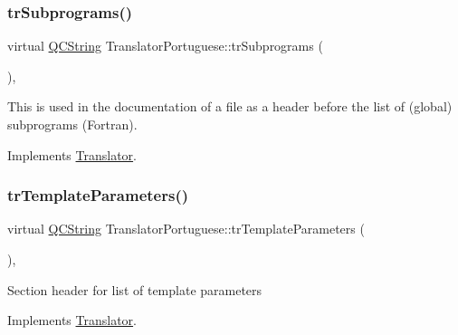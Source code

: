 \mbox{\label{class_translator_portuguese_ae3921a56819b66c9fe81c959828c3238}} 
\subsubsection{\texorpdfstring{trSubprograms()}{trSubprograms()}}
{\footnotesize\ttfamily virtual \mbox{\hyperlink{class_q_c_string}{Q\+C\+String}} Translator\+Portuguese\+::tr\+Subprograms (\begin{DoxyParamCaption}{ }\end{DoxyParamCaption})\hspace{0.3cm}{\ttfamily [inline]}, {\ttfamily [virtual]}}

This is used in the documentation of a file as a header before the list of (global) subprograms (Fortran). 

Implements \mbox{\hyperlink{class_translator}{Translator}}.

\mbox{\label{class_translator_portuguese_a4e3b0375960c26203c9ded744c716fd0}} 
\subsubsection{\texorpdfstring{trTemplateParameters()}{trTemplateParameters()}}
{\footnotesize\ttfamily virtual \mbox{\hyperlink{class_q_c_string}{Q\+C\+String}} Translator\+Portuguese\+::tr\+Template\+Parameters (\begin{DoxyParamCaption}{ }\end{DoxyParamCaption})\hspace{0.3cm}{\ttfamily [inline]}, {\ttfamily [virtual]}}

Section header for list of template parameters 

Implements \mbox{\hyperlink{class_translator}{Translator}}.

\mbox{\label{class_translator_portuguese_a7ff455cc3b1d3163ada0e1b5bd45db9e}} 

